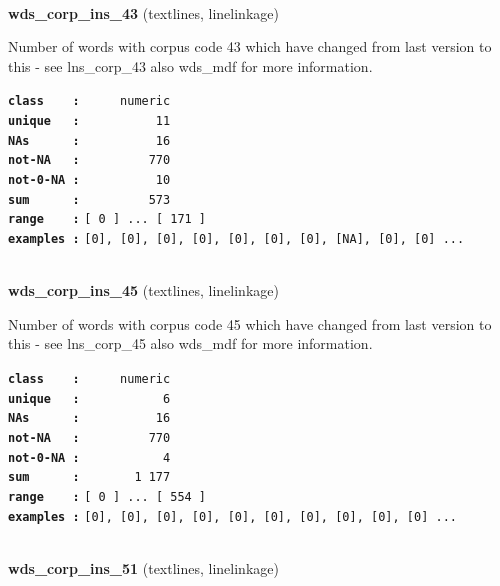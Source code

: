 \documentclass[]{article}
\begin{document}
~

\textbf{wds\_corp\_ins\_43} (textlines, linelinkage)

Number of words with corpus code 43 which have changed from last version
to this - see lns\_corp\_43 also wds\_mdf for more information.

\textbf{\texttt{class\ \ \ \ :}} \texttt{~~~~~numeric}\\
\textbf{\texttt{unique\ \ \ :}} \texttt{~~~~~~~~~~11}\\
\textbf{\texttt{NAs\ \ \ \ \ \ :}} \texttt{~~~~~~~~~~16}\\
\textbf{\texttt{not-NA\ \ \ :}} \texttt{~~~~~~~~~770}\\
\textbf{\texttt{not-0-NA\ :}} \texttt{~~~~~~~~~~10}\\
\textbf{\texttt{sum\ \ \ \ \ \ :}} \texttt{~~~~~~~~~573}\\
\textbf{\texttt{range\ \ \ \ :}}
\texttt{{[}\ 0\ {]}\ ...\ {[}\ 171\ {]}}\\
\textbf{\texttt{examples\ :}}
\texttt{{[}0{]},\ {[}0{]},\ {[}0{]},\ {[}0{]},\ {[}0{]},\ {[}0{]},\ {[}0{]},\ {[}NA{]},\ {[}0{]},\ {[}0{]}\ ...}\\

~

\textbf{wds\_corp\_ins\_45} (textlines, linelinkage)

Number of words with corpus code 45 which have changed from last version
to this - see lns\_corp\_45 also wds\_mdf for more information.

\textbf{\texttt{class\ \ \ \ :}} \texttt{~~~~~numeric}\\
\textbf{\texttt{unique\ \ \ :}} \texttt{~~~~~~~~~~~6}\\
\textbf{\texttt{NAs\ \ \ \ \ \ :}} \texttt{~~~~~~~~~~16}\\
\textbf{\texttt{not-NA\ \ \ :}} \texttt{~~~~~~~~~770}\\
\textbf{\texttt{not-0-NA\ :}} \texttt{~~~~~~~~~~~4}\\
\textbf{\texttt{sum\ \ \ \ \ \ :}} \texttt{~~~~~~~1~177}\\
\textbf{\texttt{range\ \ \ \ :}}
\texttt{{[}\ 0\ {]}\ ...\ {[}\ 554\ {]}}\\
\textbf{\texttt{examples\ :}}
\texttt{{[}0{]},\ {[}0{]},\ {[}0{]},\ {[}0{]},\ {[}0{]},\ {[}0{]},\ {[}0{]},\ {[}0{]},\ {[}0{]},\ {[}0{]}\ ...}\\

~

\textbf{wds\_corp\_ins\_51} (textlines, linelinkage)
\end{document}

